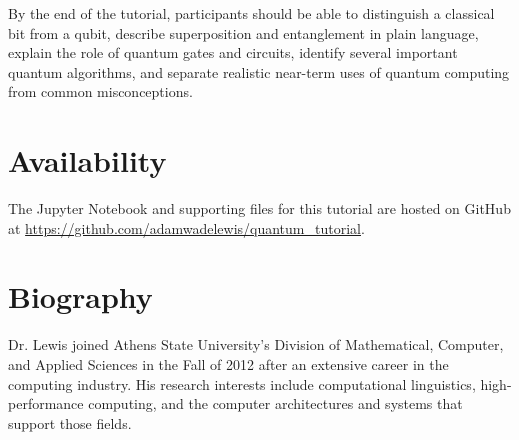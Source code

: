 \documentclass{article}
\begin{document}
By the end of the tutorial, participants should be able to distinguish a
classical bit from a qubit, describe superposition and entanglement in plain
language, explain the role of quantum gates and circuits, identify several
important quantum algorithms, and separate realistic near-term uses of quantum
computing from common misconceptions.

\section*{Availability}
The Jupyter Notebook and supporting files for this tutorial are hosted on
GitHub at \url{https://github.com/adamwadelewis/quantum_tutorial}.

\section*{Biography}
Dr. Lewis joined Athens State University's Division of Mathematical,
Computer, and Applied Sciences in the Fall of 2012 after an extensive
career in the computing industry. His research interests include
computational linguistics, high-performance computing, and the computer
architectures and systems that support those fields.

\medskip

{\small
\printbibliography
}
\end{document}
